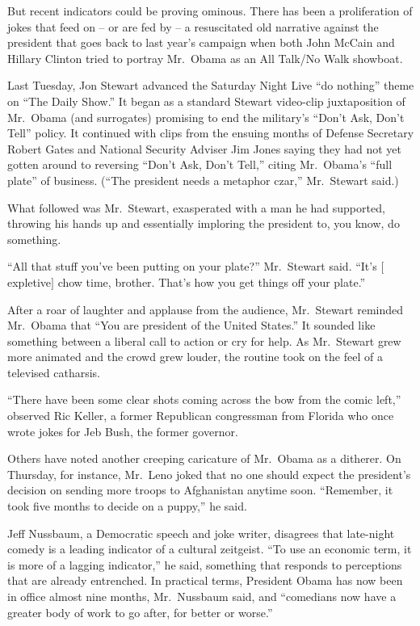 ﻿\documentclass[12pt]{article}
\begin{document}
But recent indicators could be proving ominous\cite{ominous}. There has been a
proliferation\cite{proliferation} of jokes that feed on -- or are fed by -- a
resuscitated\cite{resuscitate} old narrative against the president that goes back to last year's
campaign when both John McCain and Hillary Clinton tried to portray Mr.~Obama as an All Talk/No Walk
showboat.

Last Tuesday, Jon Stewart advanced the Saturday Night Live ``do nothing'' theme on ``The Daily
Show.'' It began as a standard Stewart video-clip juxtaposition of Mr.~Obama (and surrogates)
promising to end the military's ``Don't Ask, Don't Tell'' policy. It continued with clips from the
ensuing months of Defense Secretary Robert Gates and National Security Adviser Jim Jones saying they
had not yet gotten around to reversing ``Don't Ask, Don't Tell,'' citing Mr.~Obama's ``full plate''
of business. (``The president needs a metaphor czar,'' Mr.~Stewart said.)

What followed was Mr.~Stewart, exasperated\cite{exasperated} with a man he had supported, throwing
his hands up and essentially imploring the president to, you know, do something.

``All that stuff you've been putting on your plate?'' Mr.~Stewart said. ``It's $[$expletive$]$ chow
time, brother. That's how you get things off your plate.''

After a roar of laughter and applause from the audience, Mr.~Stewart reminded Mr.~Obama that ``You
are president of the United States.'' It sounded like something between a liberal call to action or
cry for help. As Mr.~Stewart grew more animated and the crowd grew louder, the routine took on the
feel of a televised catharsis\cite{catharsis}.

``There have been some clear shots coming across the bow from the comic left,'' observed Ric Keller,
a former Republican congressman from Florida who once wrote jokes for Jeb Bush, the former governor.

Others have noted another creeping caricature\cite{caricature} of Mr.~Obama as a ditherer. On
Thursday, for instance, Mr.~Leno joked that no one should expect the president's decision on sending
more troops to Afghanistan anytime soon. ``Remember, it took five months to decide on a puppy,'' he
said.

Jeff Nussbaum, a Democratic speech and joke writer, disagrees that late-night comedy is a leading
indicator of a cultural zeitgeist. ``To use an economic term, it is more of a lagging indicator,''
he said, something that responds to perceptions that are already entrenched. In practical terms,
President Obama has now been in office almost nine months, Mr.~Nussbaum said, and ``comedians now
have a greater body of work to go after, for better or worse.''
\end{document}
